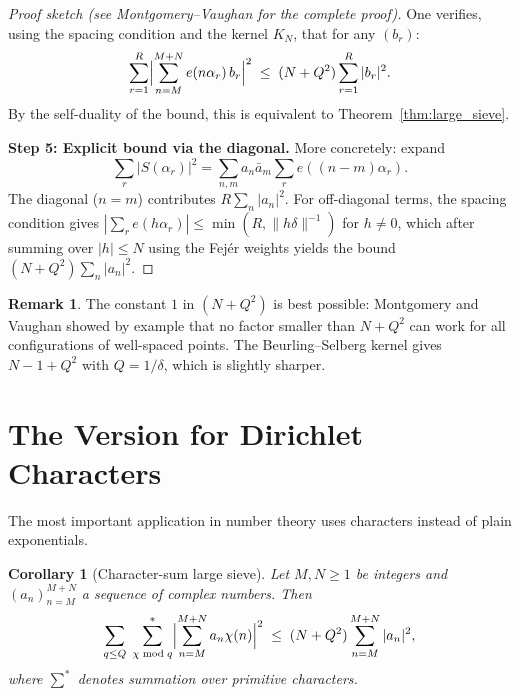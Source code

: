 \documentclass[12pt,a4paper]{amsart}
\newtheorem{corollary}[theorem]{Corollary}
\theoremstyle{definition}
\newtheorem{remark}[theorem]{Remark}
\newcommand{\eexp}[1]{e\!\left(#1\right)}
\begin{document}
\begin{proof}[Proof sketch (see Montgomery--Vaughan \cite{MV1973} for the complete proof)]
  One verifies, using the spacing condition and the kernel $K_N$, that for
  any $(b_r)$:
  \[
    \sum_{r=1}^{R}\Bigl|\sum_{n=M}^{M+N}\eexp{n\alpha_r}b_r\Bigr|^{2}
    \;\leq\;
    (N+Q^2)\sum_{r=1}^{R}|b_r|^{2}.
  \]
  By the self-duality of the bound, this is equivalent to
  Theorem~\ref{thm:large_sieve}.

  \textbf{Step 5: Explicit bound via the diagonal.}
  More concretely: expand
  \[
    \sum_{r}|S(\alpha_r)|^{2}
    = \sum_{n,m} a_n\bar{a}_m \sum_r \eexp{(n-m)\alpha_r}.
  \]
  The diagonal ($n=m$) contributes $R\sum_n|a_n|^2$.  For off-diagonal
  terms, the spacing condition gives
  $|\sum_r \eexp{h\alpha_r}| \leq \min(R, \|h\delta\|^{-1})$
  for $h \neq 0$, which after summing over $|h| \leq N$ using the Fejér
  weights yields the bound $(N + Q^2)\sum_n |a_n|^2$.  \qedhere
\end{proof}

\begin{remark}
  The constant $1$ in $(N + Q^2)$ is best possible: Montgomery and Vaughan
  showed by example that no factor smaller than $N + Q^2$ can work for all
  configurations of well-spaced points.  The Beurling--Selberg kernel gives
  $N - 1 + Q^2$ with $Q = 1/\delta$, which is slightly sharper.
\end{remark}

\section{The Version for Dirichlet Characters}

The most important application in number theory uses characters instead
of plain exponentials.

\begin{corollary}[Character-sum large sieve]\label{cor:character_large_sieve}
  Let $M, N \geq 1$ be integers and $(a_n)_{n=M}^{M+N}$ a sequence of
  complex numbers.  Then
  \[
    \sum_{q \leq Q}\;\sum_{\chi \bmod q}^{*}
    \Bigl|\sum_{n=M}^{M+N} a_n\chi(n)\Bigr|^{2}
    \;\leq\;
    (N + Q^{2})\sum_{n=M}^{M+N}|a_n|^{2},
  \]
  where $\sum^*$ denotes summation over primitive characters.
\end{corollary}
\end{document}
